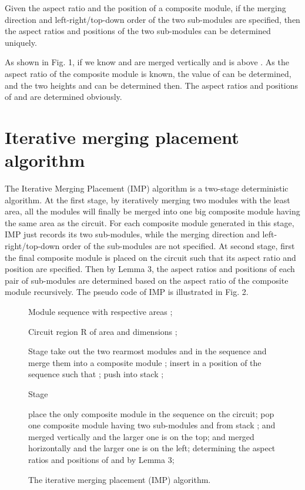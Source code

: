 \documentclass[conference]{IEEEtran}
\begin{document}
\begin{lemma}
Given the aspect ratio and the position of a composite module, if the merging direction and left-right/top-down order of the two sub-modules are specified, then the aspect ratios and positions of the two sub-modules can be determined uniquely.
\end{lemma}

As shown in Fig. 1, if we know  and  are merged vertically and  is above . As the aspect ratio of the composite module is known, the value of  can be determined, and the two heights  and  can be determined then. The aspect ratios and positions of  and  are determined obviously.


\section{Iterative merging placement algorithm}

The Iterative Merging Placement (IMP) algorithm is a two-stage deterministic algorithm. At the first stage, by iteratively merging two modules with the least area, all the modules will finally be merged into one big composite module having the same area as the circuit. For each composite module generated in this stage, IMP just records its two sub-modules, while the merging direction and left-right/top-down order of the sub-modules are not specified. At second stage, first the final composite module is placed on the circuit such that its aspect ratio and position are specified. Then by Lemma 3, the aspect ratios and positions of each pair of sub-modules are determined based on the aspect ratio of the composite module recursively. The pseudo code of IMP is illustrated in Fig. 2.


\begin{figure}[!t]
\centering

\begin{algorithmic}[]
\footnotesize
\REQUIRE
Module sequence  with respective areas ;

Circuit region R of area  and dimensions ;

\STATE Stage \uppercase \expandafter {}
\STATE take out the two rearmost modules  and  in the sequence and merge them into a composite module ;
\STATE insert  in a position  of the sequence such that ;
\STATE push  into stack ;
\ENDWHILE

\STATE Stage \uppercase \expandafter {}

\STATE place the only composite module in the sequence on the circuit;
   \STATE pop one composite module  having two sub-modules  and  from stack ;
   \IF {}
      \STATE  and  merged vertically and the larger one is on the top;
   \ELSE
      \STATE  and  merged horizontally and the larger one is on the left;
   \ENDIF
   \STATE determining the aspect ratios and positions of  and  by Lemma 3;
\ENDWHILE

\caption{The iterative merging placement (IMP) algorithm.}
\end{algorithmic}
\end{figure}
\end{document}
